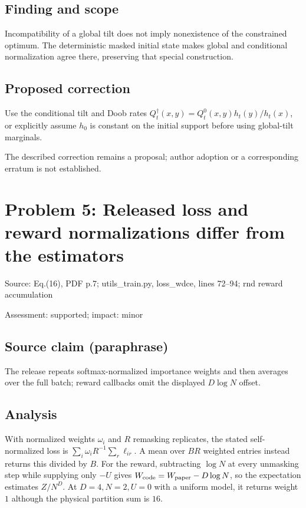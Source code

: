 \documentclass[11pt]{article}
\begin{document}
\subsection*{Finding and scope}

Incompatibility of a global tilt does not imply nonexistence of the constrained optimum. The deterministic masked initial state makes global and conditional normalization agree there, preserving that special construction.

\subsection*{Proposed correction}

Use the conditional tilt and Doob rates \(Q^\dagger_t(x,y)=Q^0_t(x,y)h_t(y)/h_t(x)\), or explicitly assume \(h_0\) is constant on the initial support before using global-tilt marginals.

The described correction remains a proposal; author adoption or a corresponding erratum is not established.

\section*{Problem 5: Released loss and reward normalizations differ from the estimators}

Source: Eq.(16), PDF p.7; utils\_train.py, loss\_wdce, lines 72–94; rnd reward accumulation

Assessment: supported; impact: minor

\subsection*{Source claim (paraphrase)}

The release repeats softmax-normalized importance weights and then averages over the full batch; reward callbacks omit the displayed \(D\log N\) offset.

\subsection*{Analysis}

With normalized weights \(\omega_i\) and \(R\) remasking replicates, the stated self-normalized loss is \(\sum_i\omega_i R^{-1}\sum_r\ell_{ir}\). A mean over \(BR\) weighted entries instead returns this divided by \(B\). For the reward, subtracting \(\log N\) at every unmasking step while supplying only \(-U\) gives \(W_{\rm code}=W_{\rm paper}-D\log N\), so the expectation estimates \(Z/N^D\). At \(D=4,N=2,U=0\) with a uniform model, it returns weight \(1\) although the physical partition sum is \(16\).
\end{document}
